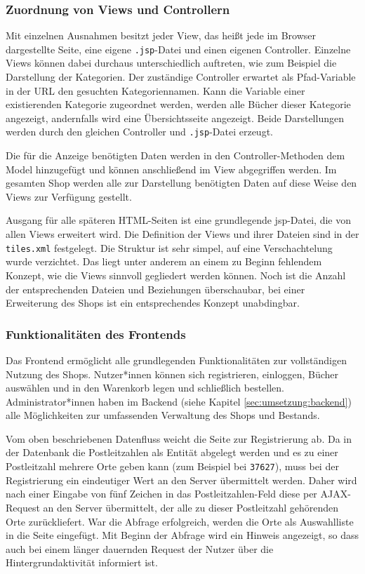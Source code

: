		\subsubsection{Zuordnung von Views und Controllern}	
		Mit einzelnen Ausnahmen besitzt jeder View, das heißt jede im Browser dargestellte Seite, eine eigene \lstinline|.jsp|-Datei und einen eigenen Controller. Einzelne Views können dabei durchaus unterschiedlich auftreten, wie zum Beispiel die Darstellung der Kategorien. Der zuständige Controller erwartet als Pfad-Variable in der URL den gesuchten Kategoriennamen. Kann die Variable einer existierenden Kategorie zugeordnet werden, werden alle Bücher dieser Kategorie angezeigt, andernfalls wird eine Übersichtsseite angezeigt. Beide Darstellungen werden durch den gleichen Controller und \lstinline|.jsp|-Datei erzeugt.
		
		Die für die Anzeige benötigten Daten werden in den Controller-Methoden dem Model hinzugefügt und können anschließend im View abgegriffen werden. Im gesamten Shop werden alle zur Darstellung benötigten Daten auf diese Weise den Views zur Verfügung gestellt.
		
		Ausgang für alle späteren HTML-Seiten ist eine grundlegende jsp-Datei, die von allen Views erweitert wird. Die Definition der Views und ihrer Dateien sind in der \lstinline|tiles.xml| festgelegt. Die Struktur ist sehr simpel, auf eine Verschachtelung wurde verzichtet. Das liegt unter anderem an einem zu Beginn fehlendem Konzept, wie die Views sinnvoll gegliedert werden können. Noch ist die Anzahl der entsprechenden Dateien und Beziehungen überschaubar, bei einer Erweiterung des Shops ist ein entsprechendes Konzept unabdingbar.
		
		\subsubsection{Funktionalitäten des Frontends}
		Das Frontend ermöglicht alle grundlegenden Funktionalitäten zur vollständigen Nutzung des Shops. Nutzer*innen können sich registrieren, einloggen, Bücher auswählen und in den Warenkorb legen und schließlich bestellen. Administrator*innen haben im Backend (siehe Kapitel \ref{sec:umsetzung:backend}) alle Möglichkeiten zur umfassenden Verwaltung des Shops und Bestands.
		
		Vom oben beschriebenen Datenfluss weicht die Seite zur Registrierung ab. Da in der Datenbank die Postleitzahlen als Entität abgelegt werden und es zu einer Postleitzahl mehrere Orte geben kann (zum Beispiel bei \lstinline|37627|), muss bei der Registrierung ein eindeutiger Wert an den Server übermittelt werden. Daher wird nach einer Eingabe von fünf Zeichen in das Postleitzahlen-Feld diese per AJAX-Request an den Server übermittelt, der alle zu dieser Postleitzahl gehörenden Orte zurückliefert. War die Abfrage erfolgreich, werden die Orte als Auswahlliste in die Seite eingefügt. Mit Beginn der Abfrage wird ein Hinweis angezeigt, so dass auch bei einem länger dauernden Request der Nutzer über die Hintergrundaktivität informiert ist.
		
